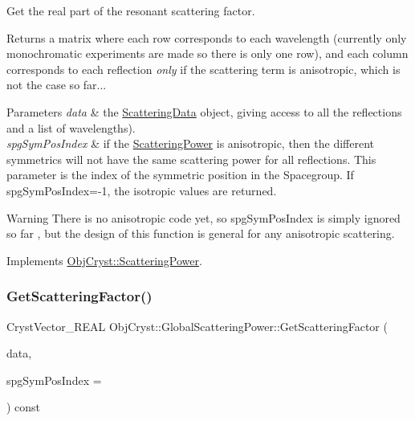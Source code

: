 Get the real part of the resonant scattering factor. 

\begin{DoxyReturn}{Returns}
a matrix where each row corresponds to each wavelength (currently only monochromatic experiments are made so there is only one row), and each column corresponds to each reflection {\itshape only} if the scattering term is anisotropic, which is not the case so far... 
\end{DoxyReturn}

\begin{DoxyParams}{Parameters}
{\em data} & the \mbox{\hyperlink{class_obj_cryst_1_1_scattering_data}{Scattering\+Data}} object, giving access to all the reflections and a list of wavelengths). \\
\hline
{\em spg\+Sym\+Pos\+Index} & if the \mbox{\hyperlink{class_obj_cryst_1_1_scattering_power}{Scattering\+Power}} is anisotropic, then the different symmetrics will not have the same scattering power for all reflections. This parameter is the index of the symmetric position in the Spacegroup. If spg\+Sym\+Pos\+Index=-\/1, the isotropic values are returned. \\
\hline
\end{DoxyParams}
\begin{DoxyWarning}{Warning}
There is no anisotropic code yet, so spg\+Sym\+Pos\+Index is simply ignored so far , but the design of this function is general for any anisotropic scattering. 
\end{DoxyWarning}


Implements \mbox{\hyperlink{class_obj_cryst_1_1_scattering_power_a42c1302254787d13b9e0f2210315291a}{Obj\+Cryst\+::\+Scattering\+Power}}.

\mbox{\label{class_obj_cryst_1_1_global_scattering_power_af81844742d8cfdca7dec979a08e4abf0}} 
\subsubsection{\texorpdfstring{GetScatteringFactor()}{GetScatteringFactor()}}
{\footnotesize\ttfamily Cryst\+Vector\+\_\+\+R\+E\+AL Obj\+Cryst\+::\+Global\+Scattering\+Power\+::\+Get\+Scattering\+Factor (\begin{DoxyParamCaption}\item[{const \mbox{\hyperlink{class_obj_cryst_1_1_scattering_data}{Scattering\+Data}} \&}]{data,  }\item[{const int}]{spg\+Sym\+Pos\+Index = {} }\end{DoxyParamCaption}) const\hspace{0.3cm}{\ttfamily [virtual]}}



